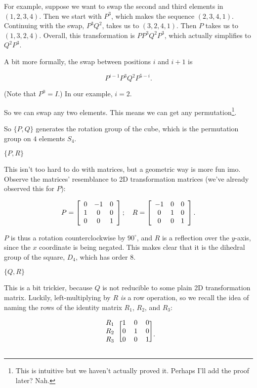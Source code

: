 \documentclass[../key.tex]{subfiles}
\begin{document}
For example, suppose we want to swap the second and third elements in $(1,2,3,4)$. Then we start with $P^3$, which makes the sequence $(2,3,4,1)$. Continuing with the swap, $P^3Q^2$, takes us to $(3,2,4,1)$. Then $P$ takes us to $(1,3,2,4)$. Overall, this transformation is $PP^3Q^2P^3$, which actually simplifies to $Q^2P^3$.

A bit more formally, the swap between positions $i$ and $i+1$ is

$$P^{i-1}P^3Q^2P^{5-i}.$$

(Note that $P^0=I$.) In our example, $i=2$.

So we can swap any two elements. This means we can get any permutation\footnote{This is intuitive but we haven't actually proved it. Perhaps I'll add the proof later? Nah.}.

So $\{P,Q\}$ generates the rotation group of the cube, which is the permutation group on $4$ elements $S_4$.

\begin{inner_problem}
\item $\{P,R\}$
\end{inner_problem}

This isn't too hard to do with matrices, but a geometric way is more fun imo. Observe the matrices' resemblance to 2D transformation matrices (we've already observed this for $P$):

$$P=\left[\begin{array}{ccc} 0 & -1 & 0 \\ 1 & 0 & 0 \\ 0 & 0 & 1 \end{array}\right];\quad R = \left[\begin{array}{ccc} -1 & 0 & 0 \\ 0 & 1 & 0 \\ 0 & 0 & 1 \end{array}\right].$$

$P$ is thus a rotation counterclockwise by $90^\circ$, and $R$ is a reflection over the $y$-axis, since the $x$ coordinate is being negated. This makes clear that it is the dihedral group of the square, $D_4$, which has order $8$.

\begin{inner_problem}
\item $\{Q,R\}$
\end{inner_problem}

This is a bit trickier, because $Q$ is not reducible to some plain 2D transformation matrix. Luckily, left-multiplying by $R$ \textit{is} a row operation, so we recall the idea of naming the rows of the identity matrix $R_1$, $R_2$, and $R_3$:

$$\begin{blockarray}{lccc}
\begin{block}{l[ccc]}
R_1 & 1 & 0 & 0 \\
R_2 & 0 & 1 & 0 \\
R_3 & 0 & 0 & 1 \\
\end{block}
\end{blockarray}.$$
\end{document}
